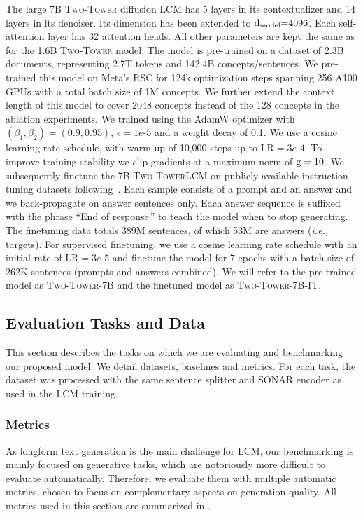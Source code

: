 \documentclass[twoside,11pt]{fairmeta}
\newcommand{\sonar}{\textsc{SONAR}\xspace}
\newcommand{\lcm}{\textsc{LCM}\xspace}
\newcommand{\twotower}{\textsc{Two-Tower}\xspace}
\newcommand{\bigtwotower}{\textsc{Two-Tower-7B}\xspace}
\newcommand{\IFTtwotower}{\textsc{Two-Tower-7B-IT}\xspace}
\newcommand{\modeldim}{\rd_\text{model}}
\newcommand{\ctxenc}{contextualizer\xspace}
\newcommand{\denoiser}{denoiser\xspace}
\newcommand{\ie}{\textit{i.e.,}\xspace}
\def\rd{{\textnormal{d}}}
\def\rg{{\textnormal{g}}}
\begin{document}
The large 7B \twotower diffusion \lcm has 5 layers in its \ctxenc and 14 layers in its \denoiser.
Its dimension has been extended to $\modeldim{=}4096$.
Each self-attention layer has 32 attention heads.
All other parameters are kept the same as for the 1.6B \twotower model. 
The model is pre-trained on a dataset of 2.3B documents, representing 2.7T tokens and 142.4B concepts/sentences.
We pre-trained this model on Meta’s RSC for 124k optimization steps spanning 256 A100 GPUs with a total batch size of 1M concepts. We further extend the context length of this model to cover 2048 concepts instead of the 128 concepts in the ablation experiments.
We trained using the AdamW optimizer with $(\beta_1, \beta_2)=(0.9, 0.95)$, $\epsilon=1e$-$5$ and a weight decay of 0.1. We use a cosine learning rate schedule, with warm-up of 10,000 steps up to $\text{LR}=3e$-$4$. To improve training stability we clip gradients at a maximum norm of $\rg=10$.
We subsequently finetune the 7B \twotower \lcm on publicly available instruction tuning datasets following~\citet{chung2024scaling}. 
Each sample consists of a prompt and an answer and we back-propagate on answer sentences only. Each answer sequence is suffixed with the phrase ``End of response.'' to teach the model when to stop generating.
The finetuning data totals 
389M sentences, of which 53M are answers 
(\ie targets).
For supervised finetuning, we use a cosine learning rate schedule with an initial rate of $\text{LR}=3e$-$5$ and finetune the model for 7 epochs with a batch size of 
262K sentences (prompts and answers combined).
We will refer to the pre-trained model as \bigtwotower and the finetuned model as \IFTtwotower. 
\subsection{Evaluation Tasks and Data}
\label{sec:task}

This section describes the tasks on which we are evaluating and benchmarking our proposed model. We detail datasets, baselines and metrics. 
For each task, the dataset was processed with the same sentence splitter and \sonar encoder as used in the \lcm training.

\subsubsection{Metrics}
\label{sub:summ_metrics}

As longform text generation is the main challenge for \lcm, our benchmarking is mainly focused on generative tasks, which are notoriously more difficult to evaluate automatically. Therefore, we evaluate them with multiple automatic metrics, chosen to focus on complementary aspects on generation quality. All metrics used in this section are summarized in . 
\end{document}
